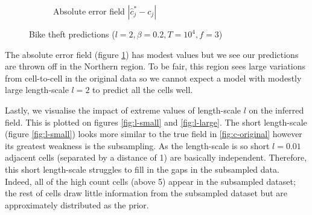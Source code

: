 \documentclass[]{article}
\begin{document}
\begin{figure}[!h]
\begin{subfigure}{0.32\linewidth}
		\caption{Absolute error field $|\hat{c}^*_j - c_j|$}
		\label{fig:c-error}
	\end{subfigure}
	\caption{Bike theft predictions ($l=2, \beta=0.2, T=10^4, f=3$)}
	\label{fig:bike-predictions}
\end{figure}

The absolute error field (figure \ref{fig:c-error}) has modest values but we see our predictions are thrown off in the Northern region. To be fair, this region sees large variations from cell-to-cell in the original data so we cannot expect a model with modestly large length-scale $l=2$ to predict all the cells well.

Lastly, we visualise the impact of extreme values of length-scale $l$ on the inferred field. This is plotted on figures \ref{fig:l-small} and \ref{fig:l-large}. The short length-scale (figure \ref{fig:l-small}) looks more similar to the true field in \ref{fig:c-original} however its greatest weakness is the subsampling. As the length-scale is so short $l=0.01$ adjacent cells (separated by a distance of 1) are basically independent. Therefore, this short length-scale struggles to fill in the gaps in the subsampled data. Indeed, all of the high count cells (above 5) appear in the subsampled dataset; the rest of cells draw little information from the subsampled dataset but are approximately distributed as the prior.
%
\end{document}
